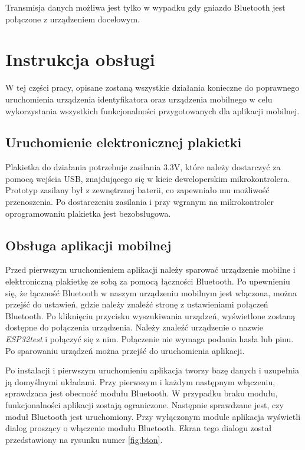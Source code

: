 \documentclass[a4paper,12pt, twoside]{article}
\begin{document}
    	Transmisja danych możliwa jest tylko w wypadku gdy gniazdo Bluetooth jest połączone z urządzeniem docelowym.
    	
    	\section{Instrukcja obsługi}
    	W tej części pracy, opisane zostaną wszystkie działania konieczne do poprawnego uruchomienia urządzenia identyfikatora oraz urządzenia mobilnego w celu wykorzystania wszystkich funkcjonalności przygotowanych dla aplikacji mobilnej.
    	
    	\subsection{Uruchomienie elektronicznej plakietki}
    	Plakietka do działania potrzebuje zasilania 3.3V, które należy dostarczyć za pomocą wejścia USB, znajdującego się w kicie deweloperskim mikrokontrolera. Prototyp zasilany był z zewnętrznej baterii, co zapewniało mu możliwość przenoszenia. Po dostarczeniu zasilania i przy wgranym na mikrokontroler oprogramowaniu plakietka jest bezobsługowa.
    	
    	\subsection{Obsługa aplikacji mobilnej}
    	Przed pierwszym uruchomieniem aplikacji należy sparować urządzenie mobilne i elektroniczną plakietkę ze sobą za pomocą łączności Bluetooth. Po upewnieniu się, że łączność Bluetooth w naszym urządzeniu mobilnym jest włączona, można przejść do ustawień, gdzie należy znaleźć stronę z ustawieniami połączeń Bluetooth. Po kliknięciu przycisku wyszukiwania urządzeń, wyświetlone zostaną dostępne do połączenia urządzenia. Należy znaleźć urządzenie o nazwie \textit{ESP32test} i połączyć się z nim. Połączenie nie wymaga podania hasła lub pinu. Po sparowaniu urządzeń można przejść do uruchomienia aplikacji. 
    	
    	Po instalacji i pierwszym uruchomieniu aplikacja tworzy bazę danych i uzupełnia ją domyślnymi układami. 
    	Przy pierwszym i każdym następnym włączeniu, sprawdzana jest obecność modułu Bluetooth. W przypadku braku modułu, funkcjonalności aplikacji zostają ograniczone. Następnie sprawdzane jest, czy moduł Bluetooth jest uruchomiony. Przy wyłączonym module aplikacja wyświetli dialog proszący o włączenie modułu Bluetooth. Ekran tego dialogu został przedstawiony na rysunku numer \ref{fig:bton}.
    	
\end{document}
